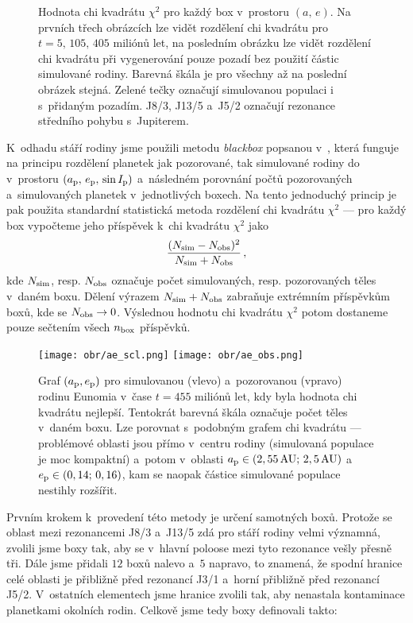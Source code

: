 \documentclass[A4paper, 12pt, oneside]{book}
\begin{document}
\begin{figure}
	\caption{Hodnota chi kvadrátu $\chi^2$ pro každý box v~prostoru $(a,\,e)$. Na prvních třech obrázcích lze vidět rozdělení chi kvadrátu pro $t=5,\,105,\,405$ miliónů let, na posledním obrázku lze vidět rozdělení chi kvadrátu při vygenerování pouze pozadí bez použití částic simulované rodiny. Barevná škála je pro všechny až na poslední obrázek stejná. Zelené tečky označují simulovanou populaci i s~přidaným pozadím. J8/3, J13/5 a~J5/2 označují rezonance středního pohybu s~Jupiterem.} \label{fig:ae_chi2}
\end{figure}

K~odhadu stáří rodiny jsme použili metodu \textit{blackbox} popsanou v~\cite{broz19}, která funguje na principu rozdělení planetek jak pozorované, tak simulované rodiny do  v~prostoru $(a_{\rm p},\,e_{\rm p},\,\sin I_{\rm p})$ a~následném porovnání počtů pozorovaných a~simulovaných planetek v~jednotlivých boxech. Na tento jednoduchý princip je pak použita standardní statistická metoda rozdělení chi kvadrátu $\chi^2$ --- pro každý box vypočteme jeho příspěvek k~chi kvadrátu $\chi^2$ jako
\begin{align}
	\frac{(N_{\rm sim}-N_{\rm obs})^2}{N_{\rm sim}+N_{\rm obs}}\,,
\end{align}
kde $N_{\rm sim}$, resp. $N_{\rm obs}$ označuje počet simulovaných, resp. pozorovaných těles v~daném boxu. Dělení výrazem $N_{\rm sim}+N_{\rm obs}$ zabraňuje extrémním příspěvkům boxů, kde se $N_{\rm obs}\rightarrow 0$. Výslednou hodnotu chi kvadrátu $\chi^2$ potom dostaneme pouze sečtením všech $n_{\rm box}$ příspěvků.

\immediate{}
\immediate{}
\begin{figure}
	\centering
	\texttt{[image: obr/ae\_scl.png]}
	\texttt{[image: obr/ae\_obs.png]}\\
	\caption{Graf $(a_{\rm p}, e_{\rm p})$ pro simulovanou (vlevo) a~pozorovanou (vpravo) rodinu Eunomia v~čase $t=455$ miliónů let, kdy byla hodnota chi kvadrátu nejlepší. Tentokrát barevná škála označuje počet těles v~daném boxu. Lze porovnat s~podobným grafem chi kvadrátu --- problémové oblasti jsou přímo v~centru rodiny (simulovaná populace je moc kompaktní) a~potom v~oblasti $a_{\rm p}\in(2,55\,{\rm AU};\,2,5\,{\rm AU})$ a~$e_{\rm p}\in(0,14;\,0,16)$, kam se naopak částice simulované populace nestihly rozšířit.} \label{fig:ae_obs_scl}
\end{figure}

Prvním krokem k~provedení této metody je určení samotných boxů. Protože se oblast mezi rezonancemi J8/3 a~J13/5 zdá pro stáří rodiny velmi významná, zvolili jsme boxy tak, aby se v~hlavní poloose mezi tyto rezonance vešly přesně tři. Dále jsme přidali $12$ boxů nalevo a~$5$ napravo, to znamená, že spodní hranice celé oblasti je přibližně před rezonancí J3/1 a~horní přibližně před rezonancí J5/2. V~ostatních elementech jsme hranice zvolili tak, aby nenastala kontaminace planetkami okolních rodin. Celkově jsme tedy boxy definovali takto:
\end{document}
